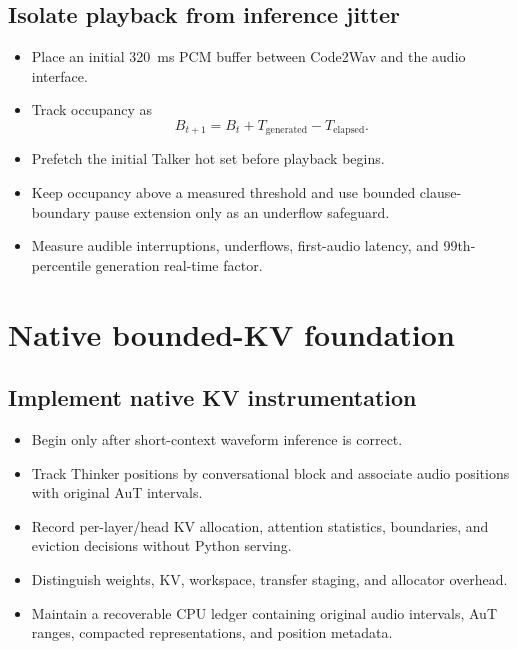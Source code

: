 \documentclass[10pt,letterpaper]{article}
\begin{document}
\subsection{Isolate playback from inference jitter}
\begin{itemize}
    \item Place an initial 320~ms PCM buffer between Code2Wav and the audio interface.
    \item Track occupancy as
    \[
    B_{t+1}=B_t+T_{\mathrm{generated}}-T_{\mathrm{elapsed}}.
    \]
    \item Prefetch the initial Talker hot set before playback begins.
    \item Keep occupancy above a measured threshold and use bounded clause-boundary pause extension only as an underflow safeguard.
    \item Measure audible interruptions, underflows, first-audio latency, and 99th-percentile generation real-time factor.
\end{itemize}

\section{Native bounded-KV foundation}

\subsection{Implement native KV instrumentation}
\begin{itemize}
    \item Begin only after short-context waveform inference is correct.
    \item Track Thinker positions by conversational block and associate audio positions with original AuT intervals.
    \item Record per-layer/head KV allocation, attention statistics, boundaries, and eviction decisions without Python serving.
    \item Distinguish weights, KV, workspace, transfer staging, and allocator overhead.
    \item Maintain a recoverable CPU ledger containing original audio intervals, AuT ranges, compacted representations, and position metadata.
\end{itemize}
\end{document}
